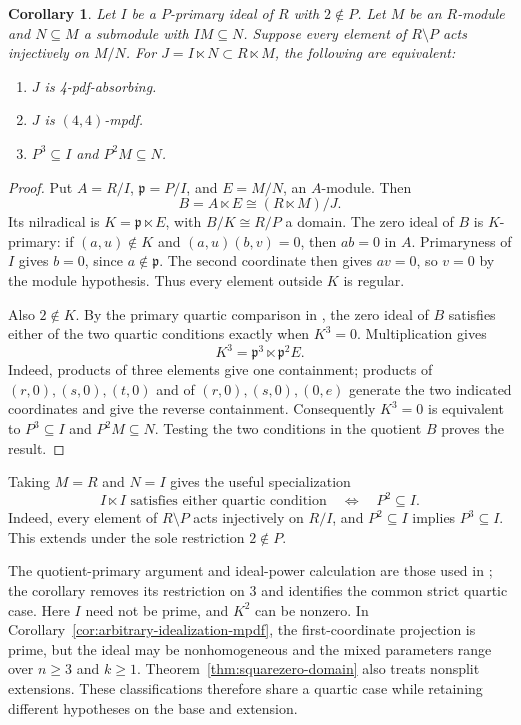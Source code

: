 \documentclass[11pt,a4paper]{amsart}
\newtheorem{corollary}[theorem]{Corollary}
\theoremstyle{definition}
\theoremstyle{remark}
\numberwithin{equation}{section}
\begin{document}
\begin{corollary}\label{quartic:homogeneous-idealization}
Let $I$ be a $P$-primary ideal of $R$ with $2\notin P$. Let $M$
be an $R$-module and $N\subseteq M$ a submodule with $IM\subseteq N$.
Suppose every element of $R\setminus P$ acts injectively on $M/N$.
For $J=I\ltimes N\subset R\ltimes M$, the following are equivalent:
\begin{enumerate}
\item $J$ is 4-pdf-absorbing.
\item $J$ is $(4,4)$-mpdf.
\item $P^3\subseteq I$ and $P^2M\subseteq N$.
\end{enumerate}
\end{corollary}
\begin{proof}
Put $A=R/I$, $\mathfrak p=P/I$, and $E=M/N$, an $A$-module.
Then
\[
 B=A\ltimes E\cong(R\ltimes M)/J.
\]
Its nilradical is $K=\mathfrak p\ltimes E$, with
$B/K\cong R/P$ a domain. The zero ideal of $B$ is $K$-primary:
if $(a,u)\notin K$ and $(a,u)(b,v)=0$, then $ab=0$ in $A$.
Primaryness of $I$ gives $b=0$, since $a\notin\mathfrak p$.
The second coordinate then gives $av=0$, so $v=0$ by the
module hypothesis. Thus every element outside $K$ is regular.

Also $2\notin K$. By the primary quartic comparison in
\cite[Theorem~3.17]{TS},
the zero ideal of $B$ satisfies either of the two quartic
conditions exactly when $K^3=0$. Multiplication gives
\[
 K^3=\mathfrak p^3\ltimes\mathfrak p^2E.
\]
Indeed, products of three elements give one containment; products
of $(r,0),(s,0),(t,0)$ and of $(r,0),(s,0),(0,e)$ generate the
two indicated coordinates and give the reverse containment.
Consequently $K^3=0$ is equivalent to
$P^3\subseteq I$ and $P^2M\subseteq N$.
Testing the two conditions in the quotient $B$ proves the result.
\end{proof}

Taking $M=R$ and $N=I$ gives the useful specialization
\[
 I\ltimes I\text{ satisfies either quartic condition}
 \quad\Longleftrightarrow\quad P^2\subseteq I.
\]
Indeed, every element of $R\setminus P$ acts injectively on $R/I$,
and $P^2\subseteq I$ implies $P^3\subseteq I$.
This extends \cite[Corollary~5.6]{TAHA} under the sole restriction
$2\notin P$.

The quotient-primary argument and ideal-power calculation are those
used in \cite[Theorem~5.5]{TAHA}; the corollary removes its
restriction on $3$ and identifies the common strict quartic case.
Here $I$ need not be prime, and $K^2$ can be nonzero. In
Corollary~\ref{cor:arbitrary-idealization-mpdf}, the first-coordinate
projection is prime, but the ideal may be nonhomogeneous and
the mixed parameters range over $n\ge3$ and $k\ge1$.
Theorem~\ref{thm:squarezero-domain} also treats nonsplit extensions.
These classifications therefore share a quartic case while
retaining different hypotheses on the base and extension.
\end{document}
